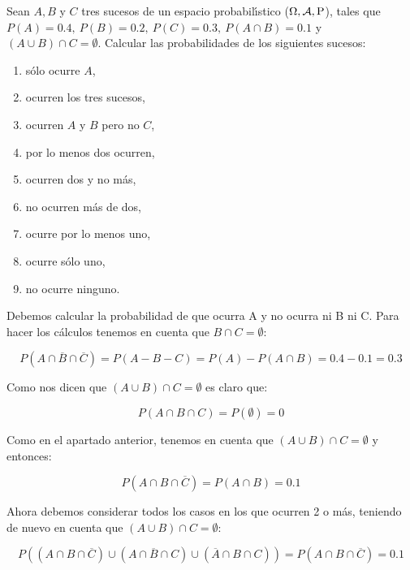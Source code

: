 \problem

Sean $A, B$ y $C$ tres sucesos de un espacio probabil{\'\i}stico ($\Omega , \cal{A} ,\mbox{P}$),  tales que $P(A)=0.4, \  P(B)=0.2, \  P(C)=0.3, \  P(A\cap B)=0.1$  y $(A\cup B)\cap C= \emptyset$.
Calcular las probabilidades de los siguientes sucesos:
\begin{enumerate}
	\item s{\'o}lo ocurre $A$,
	\item ocurren los tres sucesos,
	\item ocurren $A$ y $B$ pero no $C$,
	\item por lo menos dos ocurren,
	\item ocurren dos y no m{\'a}s,
	\item no ocurren m{\'a}s de dos,
	\item ocurre por lo menos uno,
	\item ocurre s{\'o}lo uno,
	\item no ocurre ninguno.
\end{enumerate}

\subproblem
Debemos calcular la probabilidad de que ocurra A y no ocurra ni B ni C. Para hacer los cálculos tenemos en cuenta que $B \cap C = \emptyset$:

\begin{equation*}
    P(A \cap \overline{B} \cap \overline{C}) = P(A - B - C) = P(A) - P(A \cap B) = 0.4 - 0.1 = 0.3
\end{equation*}

\subproblem
Como nos dicen que $(A \cup B) \cap C = \emptyset$ es claro que:

\begin{equation*}
    P(A \cap B \cap C) = P(\emptyset) = 0
\end{equation*}

\subproblem
Como en el apartado anterior, tenemos en cuenta que $(A \cup B) \cap C = \emptyset$ y entonces:

\begin{equation*}
    P(A \cap B \cap \overline{C}) = P(A \cap B) = 0.1
\end{equation*}

\subproblem
Ahora debemos considerar todos los casos en los que ocurren 2 o más, teniendo de nuevo en cuenta que  $(A \cup B) \cap C = \emptyset$:

\begin{equation*}
    P((A \cap B \cap \overline{C}) \cup (A \cap \overline{B} \cap C) \cup (\overline{A} \cap B \cap C)) = P(A \cap B \cap \overline{C}) = 0.1
\end{equation*}

